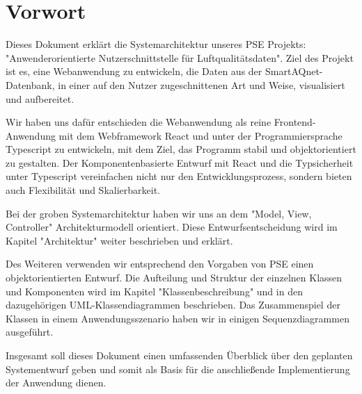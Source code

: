 \section{Vorwort}
Dieses Dokument erklärt die Systemarchitektur unseres PSE Projekts: "Anwenderorientierte Nutzerschnittstelle für Luftqualitätsdaten". Ziel des Projekt ist es, eine Webanwendung zu entwickeln, die Daten aus der \gls{SmartAQnet}-Datenbank, in einer auf den Nutzer zugeschnittenen Art und Weise, visualisiert und aufbereitet.

Wir haben uns dafür entschieden die Webanwendung als reine Frontend-Anwendung mit dem Webframework React und unter der Programmiersprache Typescript zu entwickeln, mit dem Ziel, das Programm stabil und objektorientiert zu gestalten. Der Komponentenbasierte Entwurf mit React und die Typsicherheit unter Typescript vereinfachen nicht nur den Entwicklungsprozess, sondern bieten auch Flexibilität und Skalierbarkeit.

Bei der groben Systemarchitektur haben wir uns an dem "Model, View, Controller" Architekturmodell orientiert. Diese Entwurfsentscheidung wird im Kapitel "Architektur" weiter beschrieben und erklärt.

Des Weiteren verwenden wir entsprechend den Vorgaben von PSE einen objektorientierten Entwurf. Die Aufteilung und Struktur der einzelnen Klassen und Komponenten wird im Kapitel "Klassenbeschreibung" und in den dazugehörigen UML-Klassendiagrammen beschrieben.
Das Zusammenspiel der Klassen in einem Anwendungsszenario haben wir in einigen Sequenzdiagrammen ausgeführt.

Insgesamt soll dieses Dokument einen umfassenden Überblick über den geplanten Systementwurf geben und somit als Basis für die anschließende Implementierung der Anwendung dienen.

